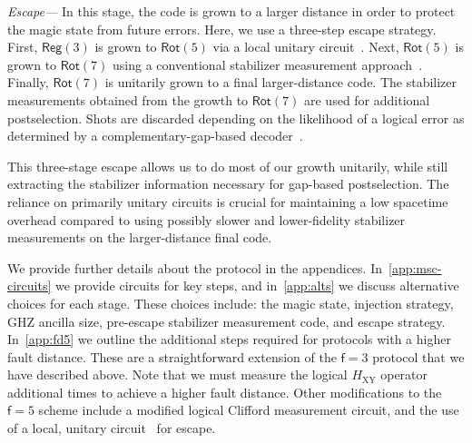 \documentclass[%
    aps, 
    physrev,
    reprint,
]{revtex4-2}
\newcommand{\fd}[1]{\mathsf{f}=#1}
\newcommand{\rot}[1]{\mathsf{Rot}(#1)}
\newcommand{\reg}[1]{\mathsf{Reg}(#1)}
\newcommand{\XY}{_\mathrm{XY}}
\begin{document}
\textit{Escape---}
In this stage, the code is grown to a larger distance in order to protect the magic state from future errors. 
Here, we use a three-step escape strategy. 
First, $\reg3$ is grown to $\rot5$ via a local unitary circuit~\cite{tsai2025unitary}.
Next, $\rot5$ is grown to $\rot7$ using a conventional stabilizer measurement approach~\cite{li2015magic}.
Finally, $\rot7$ is unitarily grown to a final larger-distance code.  
The stabilizer measurements obtained from the growth to $\rot7$ are used for additional postselection.
Shots are discarded depending on the likelihood of a logical error as determined by a complementary-gap-based decoder~\cite{gidney2025yoked,bombin2024fault,hutter2014efficient,meister2024efficient}.


This three-stage escape allows us to do most of our growth unitarily, while still extracting the stabilizer information necessary for gap-based postselection.
The reliance on primarily unitary circuits is crucial for maintaining a low spacetime overhead compared to using possibly slower and lower-fidelity stabilizer measurements on the larger-distance final code.
 
We provide further details about the protocol in the appendices.
In~\cref{app:msc-circuits} we provide circuits for key steps, and in~\cref{app:alts} we discuss alternative choices for each stage.
These choices include: the magic state, injection strategy, GHZ ancilla size, pre-escape stabilizer measurement code, and escape strategy. 
In~\cref{app:fd5} we outline the additional steps required for protocols with a higher fault distance.
These are a straightforward extension of the $\fd3$ protocol that we have described above.
Note that we must measure the logical $H\XY$ operator additional times to achieve a higher fault distance.
Other modifications to the $\fd5$ scheme include a modified logical Clifford measurement circuit, and the use of a local, unitary circuit~\cite{claes2025lowerdepthlocalencodingcircuits} for escape.
\end{document}
